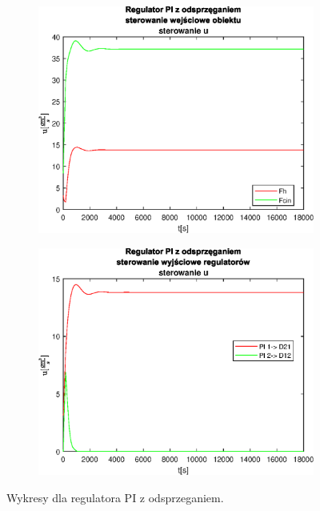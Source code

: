 \begin{figure}[h!]
   \begin{subfigure}[b]{0.4\textwidth}
      \includegraphics[width=1\linewidth]{img/PI/decoupler/noDisturbance/PIDecouplerControl0.eps}
      \caption{}
      \label{fig:fig:PIDecoupler03}
   \end{subfigure}
       
   \begin{subfigure}[b]{0.4\textwidth}
      \includegraphics[width=1\linewidth]{img/PI/decoupler/noDisturbance/PIDecouplerControlD0.eps}
      \caption{}
      \label{fig:fig:PIDecoupler04}
   \end{subfigure}
       
   \caption{Wykresy dla regulatora PI z odsprzeganiem.}
   \label{fig:PIDecoupler0}
\end{figure}
           
